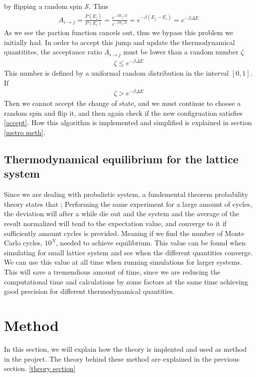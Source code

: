 \documentclass[a4paper, 10pt]{article}
\begin{document}
by flipping a random spin $\mathcal{S}$. Thus
\begin{align}
  A_{i \to j} = \frac{P(E_{j})}{P(E_{i})} = \frac{e^{-\beta E_{j}/Z }}{e^{-\beta E_{i}/Z}}
  = e^{-\beta(E_{j} -E_{i})} = e^{-\beta\Delta E}
\end{align}
As we see the partion function cancels out, thus we bypass this problem we initially had. In
order to accept this jump and update the thermodynamical quantitites, the acceptance ratio $A_{i \to j}$ must be lower than a random number $\zeta$
\begin{align}
  \zeta \le e^{-\beta\Delta E}
  \label{accept}
\end{align}
This number is defined by a uniformal random distribution in the interval $[0,1]$. If
\begin{align}
    \zeta > e^{-\beta\Delta E}
\end{align}
Then we cannot accept the change of state, and we must continue to choose a random spin
and flip it, and then again check if the new configruation satisfies \eqref{accept}.
How this algorithm is implemented and simplified is explained in section \eqref{metro meth}.

\subsection{Thermodynamical equilibrium for the lattice system \label{law of large numb}} Since we are dealing with probalistic system,
a fundemental theorem probability theory states that \cite{stat}; Performing the same experiment for a large amount of cycles,
the deviation will after a while die out and the system and the average of the result normalized will tend to
the expectation value, and converge to it if sufficiently amount cycles is provided. Meaning if we find the number of Monte Carlo
cycles, $10^{N}$, needed to achieve equilibrium. This value can be found when simulating for small lattice system and see when the different
quantities converge. We can use this value at all time when running simulations for larger systems. This will save a tremendious amount of time, since
we are reducing the computational time and calculations by some factors at the same time achieving good precision for different thermodynamical quantities.
\section{Method} In this section, we will explain how the theory is implented and used as method
in the project. The theory behind these method are explained in the previous section.
\eqref{theory section}
\end{document}
